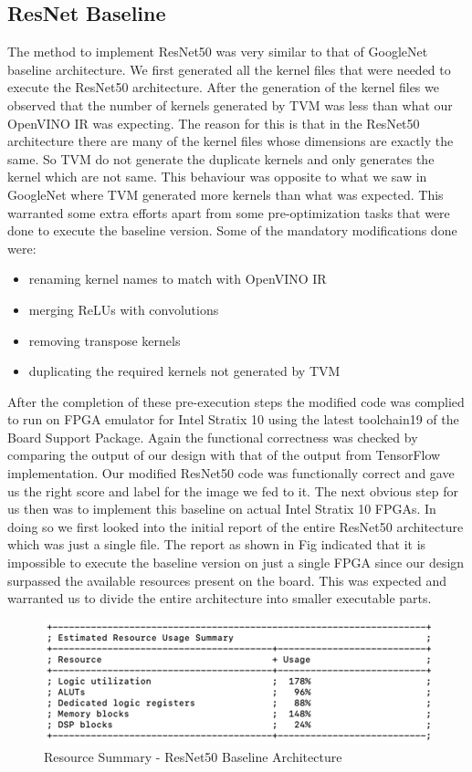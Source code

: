 \subsection{ResNet Baseline}
The method to implement ResNet50 was very similar to that of GoogleNet baseline architecture. We first generated all the kernel files that were needed to execute the ResNet50 architecture. After the generation of the kernel files we observed that the number of kernels generated by TVM was less than what our OpenVINO IR was expecting. The reason for this is that in the ResNet50 architecture there are many of the kernel files whose dimensions are exactly the same. So TVM do not generate the duplicate kernels and only generates the kernel which are not same. This behaviour was opposite to what we saw in GoogleNet where TVM generated more kernels than what was expected. This warranted some extra efforts apart from some pre-optimization tasks that were done to execute the baseline version.
Some of the mandatory modifications done were:
\begin{itemize}
    \item renaming kernel names to match with OpenVINO IR
    \item merging ReLUs with convolutions
    \item removing transpose kernels
    \item duplicating the required kernels not generated by TVM
\end{itemize}
 After the completion of these pre-execution steps the modified code was complied to run on FPGA emulator for Intel Stratix 10 using the latest toolchain19 of the Board Support Package. Again the functional correctness was checked by comparing the output of our design with that of the output from TensorFlow implementation. Our modified ResNet50 code was functionally correct and gave us the right score and label for the image we fed to it. The next obvious step for us then was to implement this baseline on actual Intel Stratix 10 FPGAs.
 \newline
 In doing so we first looked into the initial report of the entire ResNet50 architecture which was just a single file. The report as shown in Fig  indicated that it is impossible to execute the baseline version on just a single FPGA since our design surpassed the available resources present on the board. This was expected and warranted us to divide the entire architecture into smaller executable parts.
 \begin{figure}[!htb]
  \includegraphics[width=\textwidth,height=\textheight,keepaspectratio]{img/ResNet_baseline.png}
  \caption{Resource Summary - ResNet50 Baseline Architecture}
  \label{fig:ResNet50_baseline}
\end{figure}
